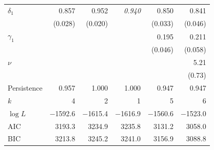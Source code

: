 \begin{tabular}{lrrrrr}
$\delta_1$ & 0.857 & 0.952 & \textit{0.940} & 0.850 & 0.841 \\
 & (0.028) & (0.020) &  & (0.033) & (0.046) \\[1pt]
$\gamma_1$ &  &  &  & 0.195 & 0.211 \\
 &  &  &  & (0.046) & (0.058) \\[1pt]
$\nu$ &  &  &  &  & 5.21 \\
 &  &  &  &  & (0.73) \\[1pt]
\midrule
Persistence & 0.957 & 1.000 & 1.000 & 0.947 & 0.947 \\
$k$ & 4 & 2 & 1 & 5 & 6 \\
$\log L$ & $-$1592.6 & $-$1615.4 & $-$1616.9 & $-$1560.6 & $-$1523.0 \\
AIC & 3193.3 & 3234.9 & 3235.8 & 3131.2 & 3058.0 \\
BIC & 3213.8 & 3245.2 & 3241.0 & 3156.9 & 3088.8 \\
\bottomrule
\end{tabular}